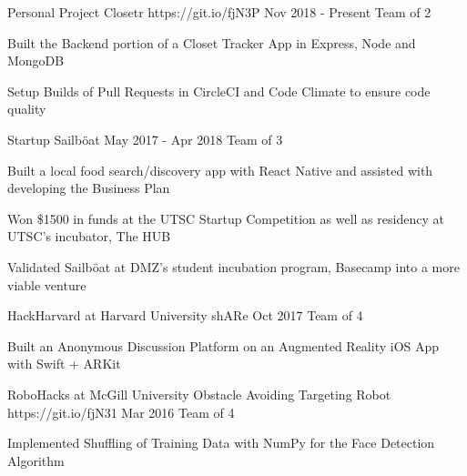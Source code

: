 \begin{cventries}
\cventry
    {Personal Project}
    {Closetr}
    {https://git.io/fjN3P}
    {Nov 2018 - Present}
    {Team of 2}
    {
      \begin{cvitems}
        \item{Built the Backend portion of a Closet Tracker App in Express, Node and MongoDB}
        \item{Setup Builds of Pull Requests in CircleCI and Code Climate to ensure code quality}
      \end{cvitems}
    }
\cventry
  {Startup}
  {Sailböat}
  {}
  {May 2017 - Apr 2018}
  {Team of 3}
  {
    \begin{cvitems}
      \item {Built a local food search/discovery app with React Native and assisted with developing the Business Plan}
      \item {Won \$1500 in funds at the UTSC Startup Competition as well as residency at UTSC's incubator, The HUB}
      \item {Validated Sailböat at DMZ's student incubation program, Basecamp into a more viable venture}
    \end{cvitems}
  }
\cventry
  {HackHarvard at Harvard University}
  {shARe}
  {}
  {Oct 2017}
  {Team of 4}
  {
    \begin{cvitems}
      \item {Built an Anonymous Discussion Platform on an Augmented Reality iOS App with Swift + ARKit}
    \end{cvitems}
  }
\cventry
  {RoboHacks at McGill University}
  {Obstacle Avoiding Targeting Robot}
  {https://git.io/fjN31}
  {Mar 2016}
  {Team of 4}
  {
    \begin{cvitems}
      \item {Implemented Shuffling of Training Data with NumPy for the Face Detection Algorithm}
    \end{cvitems}
  }
\end{cventries}
